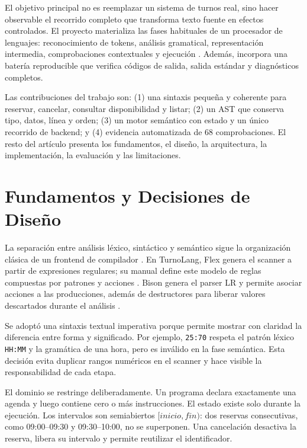 \documentclass[runningheads]{llncs}
\begin{document}
El objetivo principal no es reemplazar un sistema de turnos real, sino hacer
observable el recorrido completo que transforma texto fuente en efectos
controlados. El proyecto materializa las fases habituales de un procesador de
lenguajes: reconocimiento de tokens, análisis gramatical, representación
intermedia, comprobaciones contextuales y ejecución \cite{aho2012compilers}.
Además, incorpora una batería reproducible que verifica códigos de salida,
salida estándar y diagnósticos completos.

Las contribuciones del trabajo son: (1) una sintaxis pequeña y coherente para
reservar, cancelar, consultar disponibilidad y listar; (2) un AST que conserva
tipo, datos, línea y orden; (3) un motor semántico con estado y un único
recorrido de backend; y (4) evidencia automatizada de 68 comprobaciones. El
resto del artículo presenta los fundamentos, el diseño, la arquitectura, la
implementación, la evaluación y las limitaciones.

\section{Fundamentos y Decisiones de Diseño}

La separación entre análisis léxico, sintáctico y semántico sigue la
organización clásica de un frontend de compilador \cite{aho2012compilers}. En
TurnoLang, Flex genera el scanner a partir de expresiones regulares; su manual
define este modelo de reglas compuestas por patrones y acciones
\cite{flex2016}. Bison genera el parser LR y permite asociar acciones a las
producciones, además de destructores para liberar valores descartados durante
el análisis \cite{bison2021}.

Se adoptó una sintaxis textual imperativa porque permite mostrar con claridad
la diferencia entre forma y significado. Por ejemplo, \texttt{25:70} respeta
el patrón léxico \texttt{HH:MM} y la gramática de una hora, pero es inválido en
la fase semántica. Esta decisión evita duplicar rangos numéricos en el scanner
y hace visible la responsabilidad de cada etapa.

El dominio se restringe deliberadamente. Un programa declara exactamente una
agenda y luego contiene cero o más instrucciones. El estado existe solo durante
la ejecución. Los intervalos son semiabiertos $[inicio, fin)$: dos reservas
consecutivas, como 09:00--09:30 y 09:30--10:00, no se superponen. Una
cancelación desactiva la reserva, libera su intervalo y permite reutilizar el
identificador.
\end{document}
